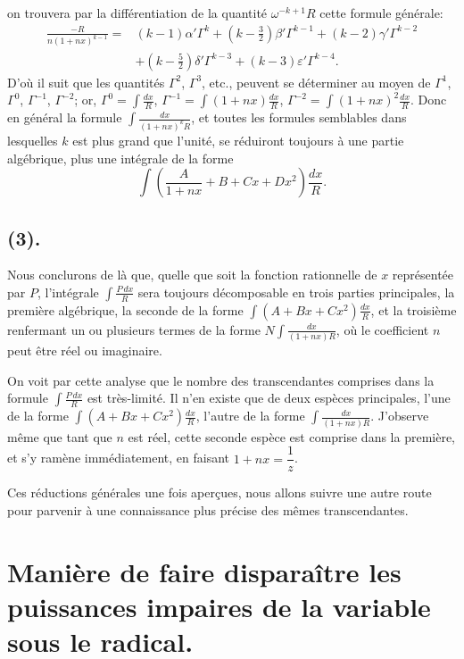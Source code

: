 \documentclass{article}
\begin{document}
on trouvera par la différentiation de la quantité $\omega^{-k+1}R$ cette formule générale:
\[ \begin{aligned} \frac{-R}{n(1+nx)^{k-1}}={}&(k-1)\alpha'\Gamma^{k}+(k-\tfrac{3}{2})\beta'\Gamma^{k-1}+(k-2)\gamma'\Gamma^{k-2}\\ &+(k-\tfrac{5}{2})\delta'\Gamma^{k-3}+(k-3)\varepsilon'\Gamma^{k-4}. \end{aligned} \]
D'où il suit que les quantités $\Gamma^{2}$, $\Gamma^{3}$, etc., peuvent se déterminer au moyen de $\Gamma^{1}$, $\Gamma^{0}$, $\Gamma^{-1}$, $\Gamma^{-2}$; or, $\displaystyle\Gamma^{0}=\int\frac{dx}{R}$, $\displaystyle\Gamma^{-1}=\int(1+nx)\frac{dx}{R}$, $\displaystyle\Gamma^{-2}=\int(1+nx)^{2}\frac{dx}{R}$. Donc en général la formule $\displaystyle\int\frac{dx}{(1+nx)^{k}R}$, et toutes les formules semblables dans lesquelles $k$ est plus grand que l'unité, se réduiront toujours à une partie algébrique, plus une intégrale de la forme
\[ \int\left(\frac{A}{1+nx}+B+Cx+Dx^{2}\right)\frac{dx}{R}. \]

\subsection*{(3).}

Nous conclurons de là que, quelle que soit la fonction rationnelle de $x$ représentée par $P$, l'intégrale $\displaystyle\int\frac{P\,dx}{R}$ sera toujours décomposable en trois parties principales, la première algébrique, la seconde de la forme $\displaystyle\int(A+Bx+Cx^{2})\frac{dx}{R}$, et la troisième renfermant un ou plusieurs termes de la forme $\displaystyle N\int\frac{dx}{(1+nx)R}$, où le coefficient $n$ peut être réel ou imaginaire.

On voit par cette analyse que le nombre des transcendantes comprises dans la formule $\displaystyle\int\frac{P\,dx}{R}$ est très-limité. Il n'en existe que de deux espèces principales, l'une de la forme $\displaystyle\int(A+Bx+Cx^{2})\frac{dx}{R}$, l'autre de la forme $\displaystyle\int\frac{dx}{(1+nx)R}$. J'observe même que tant que $n$ est réel, cette seconde espèce est comprise dans la première, et s'y ramène immédiatement, en faisant $1+nx=\dfrac{1}{z}$.

Ces réductions générales une fois aperçues, nous allons suivre une autre route pour parvenir à une connaissance plus précise des mêmes transcendantes.


\section*{Manière de faire disparaître les puissances impaires de la variable sous le radical.}
\end{document}
